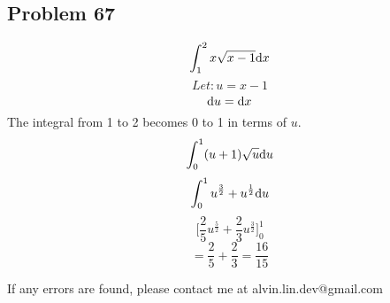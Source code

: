 \documentclass[letterpaper, 12pt]{math}
\begin{document}
\subsection*{Problem 67}
\[ \int_{1}^{2} x \sqrt{x - 1} \mathrm{d}{x} \]
\[ Let: u = x - 1 \]
\[ \mathrm{d}{u} = \mathrm{d}{x} \]
The integral from 1 to 2 becomes 0 to 1 in terms of \( u \).
\[ \int_{0}^{1} (u + 1)\sqrt{u} \mathrm{d}{u} \]
\[ \int_{0}^{1} u^\frac{3}{2} + u^\frac{1}{2} \mathrm{d}{u} \]
\[ \bigg[ \frac{2}{5}u^{\frac{5}{2}} + \frac{2}{3}u^{\frac{3}{2}} \bigg]_0^1 \]
\[ = \frac{2}{5} + \frac{2}{3} = \frac{16}{15} \]

\begin{center}
  If any errors are found, please contact me at alvin.lin.dev@gmail.com
\end{center}
\end{document}
